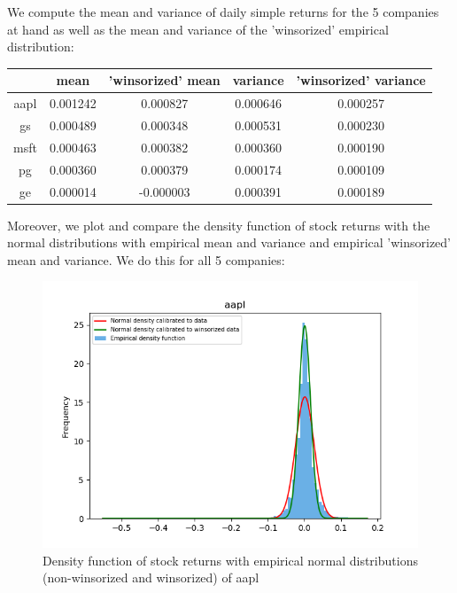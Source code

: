 \documentclass[10pt]{article}
\newenvironment{exercise}[2][Exercise]{\begin{trivlist}
  \item[\hskip \labelsep {\bfseries #1}\hskip \labelsep {\bfseries #2.}]}{\end{trivlist}}
\begin{document}
\begin{exercise}{3}

	We compute the mean and variance of daily simple returns for the 5 companies at hand as well as the mean and variance of the 'winsorized' empirical distribution:
	
	\begin{table}[h!]
		\centering
 		\begin{tabular}{||c c c c c||} 
 		\hline
		& mean & 'winsorized' mean & variance & 'winsorized' variance \\ [0.5ex] 
 		\hline\hline
 		aapl & 0.001242 & 0.000827 & 0.000646 & 0.000257 \\ 
 		gs & 0.000489 & 0.000348 & 0.000531 & 0.000230 \\
 		msft & 0.000463 & 0.000382 & 0.000360 & 0.000190 \\
 		pg & 0.000360 & 0.000379 & 0.000174 & 0.000109 \\
 		ge & 0.000014 & -0.000003 & 0.000391 & 0.000189 \\ [1ex] 
 \hline
 \end{tabular}
	\end{table}
	
	Moreover, we plot and compare the density function of stock returns with the normal distributions with empirical mean and variance and empirical 'winsorized' mean and variance. We do this for all 5 companies:
	
		\begin{figure}[H]
	
			\centering
			\includegraphics[scale=0.7]{Figures/ex3_aapl.png}	
			\caption{Density function of stock returns with empirical normal distributions (non-winsorized and winsorized) of aapl}	
			\label{fig:ex3_aapl}
	

\end{figure}
\end{exercise}
\end{document}
